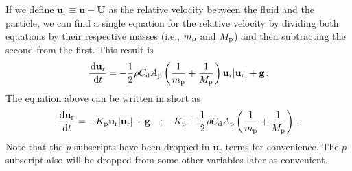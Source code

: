 If we define $\mathbf{u}_\text{r} \equiv \mathbf{u} - \mathbf{U}$ as the relative velocity between the fluid and the particle, we
can find a single equation for the relative velocity by dividing both equations by their respective masses (i.e., $m_{\rm p}$ and
$M_{\rm p}$) and then subtracting the second from the first. This result is
\begin{align}
    \frac{\,\mathrm{d} \mathbf{u}_\text{r}}{\,\mathrm{d} t} = -\frac{1}{2} \rho C_\text{d} A_{\rm p} \left(\frac{1}{m_{\rm p}} + \frac{1}{M_{\rm p}}
\right) \mathbf{u}_\text{r} |\mathbf{u}_\text{r}| + \mathbf{g} \,.
\end{align}
The equation above can be written in short as
\begin{align}
    \frac{\,\mathrm{d} \mathbf{u}_\text{r}}{\,\mathrm{d} t} = -K_{\rm p} \mathbf{u}_\text{r} |\mathbf{u}_\text{r}| + \mathbf{g} \quad ; \quad K_{\rm
p} \equiv \frac{1}{2} \rho C_\text{d} A_{\rm p} \left(\frac{1}{m_{\rm p}} + \frac{1}{M_{\rm p}} \right) \,.
\end{align}
Note that the $p$ subscripts have been dropped in $\mathbf{u}_\text{r}$ terms for convenience. The $p$ subscript also will be
dropped from some other variables later as convenient.

